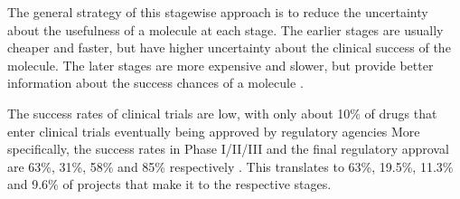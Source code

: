 The general strategy of this stagewise approach is to reduce the uncertainty about the usefulness of
a molecule at each stage. The earlier stages are usually cheaper and faster, but have higher
uncertainty about the clinical success of the molecule. The later stages are more expensive and
slower, but provide better information about the success chances of a molecule \citep{todo}.

The success rates of clinical trials are low, with only about 10\% of drugs that enter clinical
trials eventually being approved by regulatory agencies More specifically, the success rates in
Phase I/II/III and the final regulatory approval are 63\%, 31\%, 58\% and 85\% respectively
\citep{mullardParsingClinicalSuccess2016}. This translates to 63\%, 19.5\%, 11.3\% and 9.6\% of
projects that make it to the respective stages.

